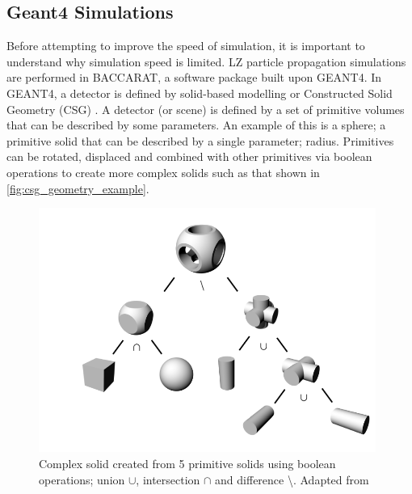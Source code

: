 \subsection{Geant4 Simulations}
\par
Before attempting to improve the speed of simulation, it is important to understand why simulation speed is limited. 
LZ particle propagation simulations are performed in BACCARAT, a software package built upon GEANT4.
In GEANT4, a detector is defined by solid-based modelling or Constructed Solid Geometry (CSG) \cite{geant4_geometry_ref}.
A detector (or scene) is defined by a set of primitive volumes that can be described by some parameters.
An example of this is a sphere; a primitive solid that can be described by a single parameter; radius.
Primitives can be rotated, displaced and combined with other primitives via boolean operations to create more complex solids such as that shown in \autoref{fig:csg_geometry_example}.
\begin{figure}
\includegraphics[height=8cm]{Figures/Simulations/csg_geometry.png}
\centering
\caption{Complex solid created from 5 primitive solids using boolean operations; union $\cup$, intersection $\cap$ and difference \textbackslash. Adapted from \cite{csg_geomtry_ref}}
\label{fig:csg_geometry_example}
\end{figure}

